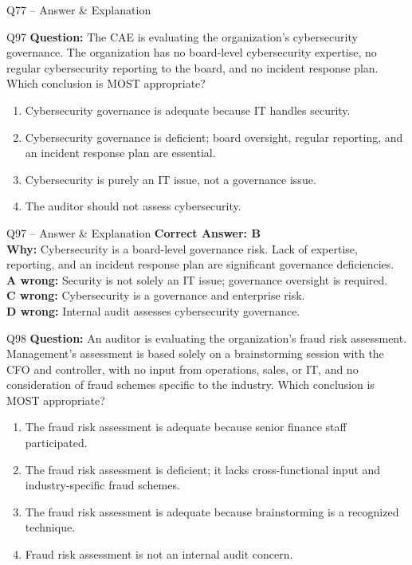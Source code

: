 \documentclass[aspectratio=169,10pt]{beamer}
\begin{document}
\begin{frame}[t]{Q77 -- Answer \& Explanation}
	\begin{frame}[t]{Q97}
		\small
		\textbf{Question:} The CAE is evaluating the organization's cybersecurity governance. The organization has no board-level cybersecurity expertise, no regular cybersecurity reporting to the board, and no incident response plan. Which conclusion is MOST appropriate?
		\begin{enumerate}[label=\Alph*.,itemsep=1pt,topsep=2pt]
			\item Cybersecurity governance is adequate because IT handles security.
			\item Cybersecurity governance is deficient; board oversight, regular reporting, and an incident response plan are essential.
			\item Cybersecurity is purely an IT issue, not a governance issue.
			\item The auditor should not assess cybersecurity.
		\end{enumerate}
	\end{frame}
	
	\begin{frame}[t]{Q97 -- Answer \& Explanation}
		\small
		\textbf{Correct Answer: B} \\[4pt]
		\textbf{Why:} Cybersecurity is a board-level governance risk. Lack of expertise, reporting, and an incident response plan are significant governance deficiencies. \\[4pt]
		\textbf{A wrong:} Security is not solely an IT issue; governance oversight is required. \\[2pt]
		\textbf{C wrong:} Cybersecurity is a governance and enterprise risk. \\[2pt]
		\textbf{D wrong:} Internal audit assesses cybersecurity governance.
	\end{frame}
	
	\begin{frame}[t]{Q98}
		\small
		\textbf{Question:} An auditor is evaluating the organization's fraud risk assessment. Management's assessment is based solely on a brainstorming session with the CFO and controller, with no input from operations, sales, or IT, and no consideration of fraud schemes specific to the industry. Which conclusion is MOST appropriate?
		\begin{enumerate}[label=\Alph*.,itemsep=1pt,topsep=2pt]
			\item The fraud risk assessment is adequate because senior finance staff participated.
			\item The fraud risk assessment is deficient; it lacks cross-functional input and industry-specific fraud schemes.
			\item The fraud risk assessment is adequate because brainstorming is a recognized technique.
			\item Fraud risk assessment is not an internal audit concern.
		\end{enumerate}
	\end{frame}
	

\end{frame}
\end{document}
